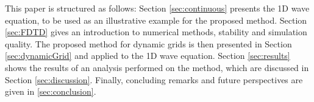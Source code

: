 


This paper is structured as follows: Section \ref{sec:continuous} presents the 1D wave equation, to be used as an illustrative example for the proposed method. Section \ref{sec:FDTD} gives an introduction to numerical methods, stability and simulation quality. The proposed method for dynamic grids is then presented in Section \ref{sec:dynamicGrid} and applied to the 1D wave equation. Section \ref{sec:results} shows the results of an analysis performed on the method, which are discussed in Section \ref{sec:discussion}. Finally, concluding remarks and future perspectives are given in \ref{sec:conclusion}.